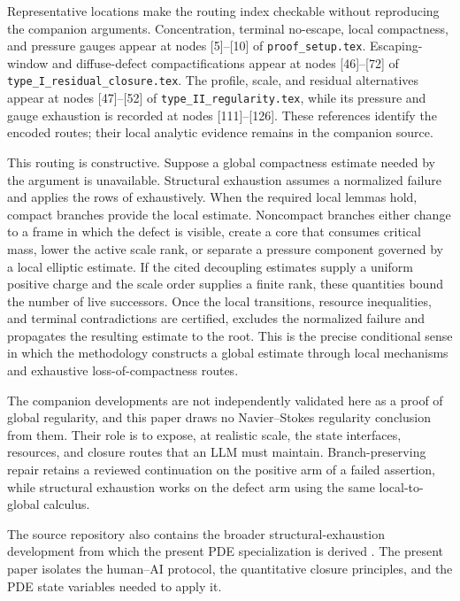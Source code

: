 \documentclass[11pt,reqno]{amsart}
\theoremstyle{plain}
\theoremstyle{definition}
\theoremstyle{remark}
\numberwithin{equation}{section}
\begin{document}
Representative locations make the routing index checkable without reproducing
the companion arguments.  Concentration, terminal no-escape, local compactness,
and pressure gauges appear at nodes [5]--[10] of
\texttt{proof\_setup.tex}.  Escaping-window and diffuse-defect compactifications
appear at nodes [46]--[72] of \texttt{type\_I\_residual\_closure.tex}.  The
profile, scale, and residual alternatives appear at nodes [47]--[52] of
\texttt{type\_II\_regularity.tex}, while its pressure and gauge exhaustion is
recorded at nodes [111]--[126].  These references identify the encoded routes;
their local analytic evidence remains in the companion source.

This routing is constructive.  Suppose a global compactness estimate needed by
the argument is unavailable.  Structural exhaustion assumes a normalized
failure and applies the rows of  exhaustively.
When the required local lemmas hold, compact branches provide the local estimate.  Noncompact branches either change
to a frame in which the defect is visible, create a core that consumes critical
mass, lower the active scale rank, or separate a pressure component governed by
a local elliptic estimate.  If the cited decoupling estimates supply a uniform
positive charge and the scale order supplies a finite rank, these quantities
bound the number of live successors.  Once the local transitions, resource
inequalities, and terminal contradictions are certified,
 excludes the normalized failure and
propagates the resulting estimate to the root.  This is the precise conditional
sense in which the methodology constructs a global estimate through local
mechanisms and exhaustive loss-of-compactness routes.

The companion developments are not independently validated here as a proof of
global regularity, and this paper draws no Navier--Stokes regularity conclusion
from them.  Their role is to expose, at realistic scale, the state interfaces,
resources, and closure routes that an LLM must maintain.  Branch-preserving
repair retains a reviewed continuation on the positive arm of a failed
assertion, while structural exhaustion works on the defect arm using the same
local-to-global calculus.

The source repository also contains the broader structural-exhaustion development
from which the present PDE specialization is derived
\cite{DuranBallester2026}.  The present paper isolates the human--AI protocol,
the quantitative closure principles, and the PDE state variables needed to
apply it.
\end{document}
